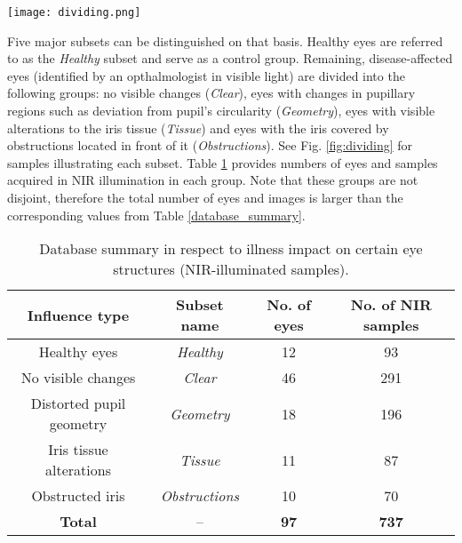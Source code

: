 \documentclass[conference]{IEEEtran}
\begin{document}
\begin{figure*}[!ht]
\centering
\texttt{[image: dividing.png]}
\caption{Samples representing example ocular conditions that determine inclusion of that particular eye into one of the subsets, namely \emph{Clear} (A), \emph{Geometry} (B), \emph{Tissue} (C) or \emph{Obstructions} (D).}
\label{fig:dividing}
\end{figure*}

Five major subsets can be distinguished on that basis. Healthy eyes are referred to as the \emph{Healthy} subset and serve as a control group. Remaining, disease-affected eyes (identified by an opthalmologist in visible light) are divided into the following groups: no visible changes (\emph{Clear}), eyes with changes in pupillary regions such as deviation from pupil's circularity (\emph{Geometry}), eyes with visible alterations to the iris tissue (\emph{Tissue}) and eyes with the iris covered by obstructions located in front of it (\emph{Obstructions}). See Fig. \ref{fig:dividing} for samples illustrating each subset. Table \ref{database_summary_divided} provides numbers of eyes and samples acquired in NIR illumination in each group. Note that these groups are not disjoint, therefore the total number of eyes and images is larger than the corresponding values from Table \ref{database_summary}.



\begin{table}[!htb]
\renewcommand{\arraystretch}{1.1}

\caption{Database summary in respect to illness impact on certain eye structures (NIR-illuminated samples).}
\label{database_summary_divided}
\centering
\begin{tabular}{|c|c|c|c|}
\hline
\textbf{Influence type}  & \textbf{Subset name} & \textbf{No. of eyes} & \textbf{No. of NIR samples}\\
\hline
\hline
Healthy eyes & \emph{Healthy} & 12  &  93\\
\hline
No visible changes & \emph{Clear} & 46  & 291 \\
\hline
Distorted pupil geometry & \emph{Geometry} & 18 & 196\\
\hline
Iris tissue alterations & \emph{Tissue} & 11 & 87\\
\hline
Obstructed iris &  \emph{Obstructions} & 10 & 70\\
\hline
\hline
\textbf{Total} & -- & \textbf{97} & \textbf{737}\\
\hline
\end{tabular}
\end{table}
\end{document}
